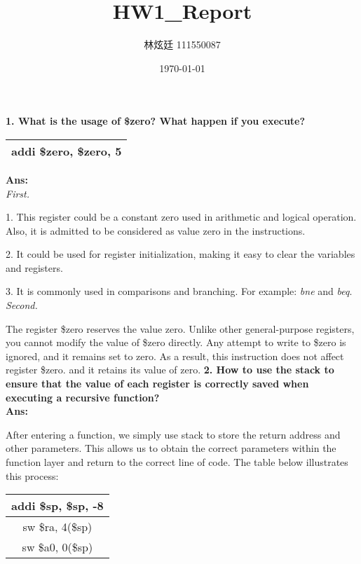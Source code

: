 \documentclass[a4paper, 12pt]{article}
\begin{document}
\title{HW1\_Report}
\author{林炫廷 111550087}
\date{\today}
\maketitle
{\bf1. What is the usage of \$zero? What happen if you execute?}\par
\begin{center}
    \begin{tabular}{|c|}
        \hline
        addi \$zero, \$zero, 5 \\
        \hline
    \end{tabular}
\end{center}
{\bf Ans: }\\
{\it First.}\par
1. This register could be a constant zero used in arithmetic and
logical operation. Also, it is admitted to be considered as value zero in the instructions.\par
2. It could be used for register initialization, making it easy to clear the variables and registers.\par
3. It is commonly used in comparisons and branching. For example: {\sl bne} and {\sl beq}.\\
{\it Second.}\par
The register \$zero reserves the value zero. Unlike other general-purpose registers,
you cannot modify the value of \$zero directly.
Any attempt to write to \$zero is ignored, and it remains set to zero.
As a result, this instruction does not affect register \$zero. and it retains its value of zero.
\newpage
{\bf 2. How to use the stack to ensure that the value of each register is correctly saved when executing a recursive function? }\\
{\bf Ans: }\par
After entering a function, we simply use stack to store the return address and other parameters.
This allows us to obtain the correct parameters
within the function layer and return to the correct line of code.
The table below illustrates this process:
\begin{center}
    \begin{tabular}{|c|}
        \hline
        addi	\$sp, \$sp, -8 \\
        \hline
        sw		\$ra, 4(\$sp)   \\
        \hline
        sw		\$a0, 0(\$sp)   \\
        \hline
    \end{tabular}
\end{center}\par
\end{document}
